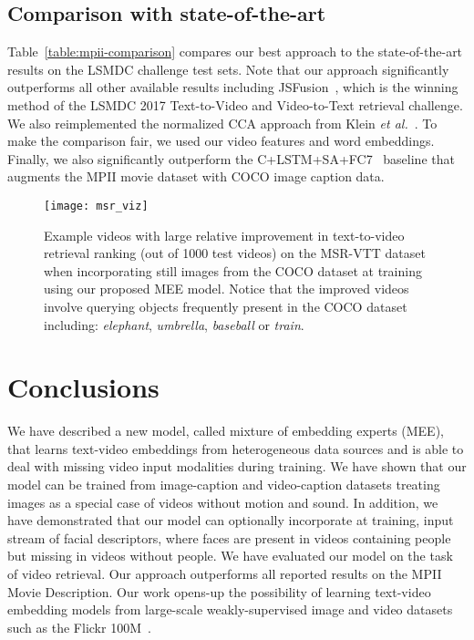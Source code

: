 \documentclass[runningheads]{llncs}
\begin{document}
\subsection{Comparison with state-of-the-art}
Table~\ref{table:mpii-comparison} compares our best approach to the state-of-the-art results on the LSMDC challenge test sets. Note that our approach significantly outperforms all other available results including JSFusion~\cite{yu17jsf}, which is the winning method of the LSMDC 2017 Text-to-Video and Video-to-Text retrieval challenge. We also reimplemented the normalized CCA approach from Klein \textit{et al.}~\cite{klein15associating}. To make the comparison fair, we used our video features and word embeddings. Finally, we also significantly outperform the C+LSTM+SA+FC7~\cite{torabi16learning} baseline that augments the MPII movie dataset with COCO image caption data. 



\begin{figure}[t]
  \begin{center}
     \texttt{[image: msr\_viz]}
\end{center}
\vspace{-0.6cm}
\caption{\small Example videos with large relative improvement in text-to-video retrieval ranking (out of 1000 test videos) on the MSR-VTT dataset when incorporating still images from the COCO dataset at training using our proposed MEE model. Notice that the improved videos involve querying objects frequently present in the COCO dataset including: \textit{elephant}, \textit{umbrella}, \textit{baseball} or  \textit{train}.}
\label{fig:msr-viz}
\end{figure}


\section{Conclusions}
We have described a new model, called mixture of embedding experts (MEE), that learns text-video embeddings from heterogeneous data sources and is able to deal with missing video input modalities during training. We have shown that our model can be trained from image-caption and video-caption datasets treating images as a special case of videos without motion and sound. In addition, we have demonstrated that our model can optionally incorporate at training, input stream of facial descriptors, where faces are present in videos containing people but missing in videos without people. We have evaluated our model on the task of video retrieval. Our approach outperforms all reported results on the MPII Movie Description. Our work opens-up the possibility of learning text-video embedding models from large-scale weakly-supervised image and video datasets such as the Flickr 100M~\cite{thomee2016yfcc100m}.  
\end{document}
